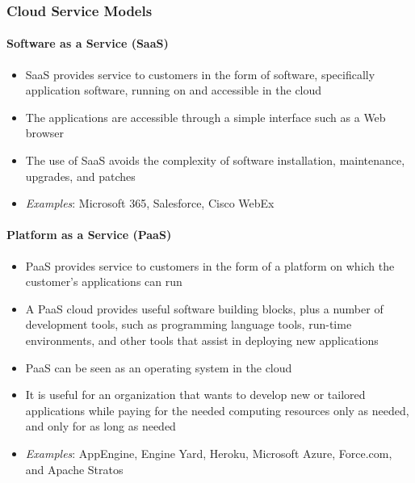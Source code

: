 \subsubsection{Cloud Service Models}

\paragraph{Software as a Service (SaaS)}
\begin{itemize}
    \item SaaS provides service to customers in the form of software, specifically application software, running on and accessible in the cloud
    \item The applications are accessible through a simple interface such as a Web browser
    \item The use of SaaS avoids the complexity of software installation, maintenance, upgrades, and patches
    \item \textit{Examples}: Microsoft 365, Salesforce, Cisco WebEx
\end{itemize}

\paragraph{Platform as a Service (PaaS)}
\begin{itemize}
    \item PaaS provides service to customers in the form of a platform on which the customer's applications can run
    \item A PaaS cloud provides useful software building blocks, plus a number of development tools, such as programming language tools, run-time environments, and other tools that assist in deploying new applications
    \item PaaS can be seen as an operating system in the cloud
    \item It is useful for an organization that wants to develop new or tailored applications while paying for the needed computing resources only as needed, and only for as long as needed
    \item \textit{Examples}: AppEngine, Engine Yard, Heroku, Microsoft Azure, Force.com, and Apache Stratos
\end{itemize}

